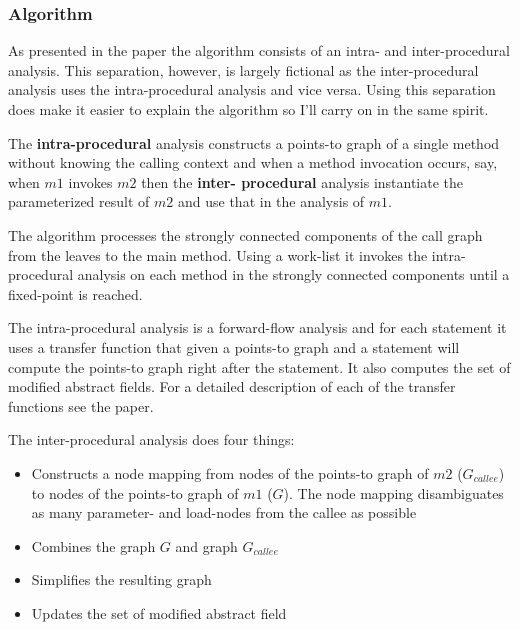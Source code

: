 \documentclass[11pt]{exam}
\begin{document}
\subsubsection*{Algorithm}

As presented in the paper the algorithm consists of an intra- and
inter-procedural analysis. This separation, however, is largely
fictional as the inter-procedural analysis uses the intra-procedural
analysis and vice versa. Using this separation does make it easier to
explain the algorithm so I'll carry on in the same spirit. \newline

The \textbf{intra-procedural} analysis constructs a points-to graph of
a single method without knowing the calling context and  when a method
invocation occurs, say, when $m1$ invokes $m2$ then the \textbf{inter-
procedural} analysis instantiate the  parameterized result of $m2$ and
use that in the analysis of $m1$. \newline

The algorithm processes the strongly connected components of the call
graph from the leaves to the main method. Using a work-list it invokes
the  intra-procedural analysis on each method in the strongly
connected components until a fixed-point is reached. \newline

The intra-procedural analysis is a forward-flow analysis and for each
statement it uses a transfer function that given a points-to graph and
a statement will compute the points-to graph right after the
statement. It also computes the set of modified abstract fields. For a
detailed description of each of the transfer functions see the paper.
\newline

The inter-procedural analysis does four things: 

\begin{itemize}
  \setlength{\itemsep}{1pt}
  \setlength{\parskip}{0pt}
  \item Constructs a node mapping from nodes of the points-to graph of 
        $m2$ ($G_{callee}$) to nodes of the points-to graph of 
        $m1$ ($G$). The node mapping disambiguates as many parameter- 
        and load-nodes from the callee as possible
  \item Combines the graph $G$ and graph $G_{callee}$
  \item Simplifies the resulting graph
  \item Updates the set of modified abstract field
\end{itemize}
\end{document}

